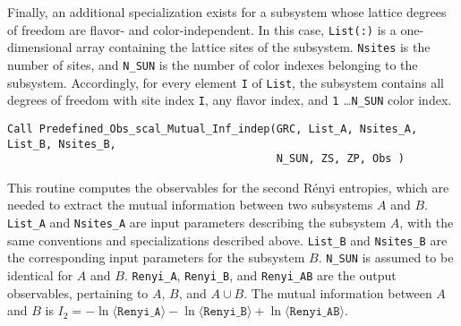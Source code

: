 Finally, an additional specialization exists for a subsystem whose lattice degrees of freedom are flavor- and color-independent. In this case, \texttt{List(:)} is a one-dimensional array containing the lattice sites of the subsystem. \texttt{Nsites} is the number of sites, and \texttt{N\_SUN} is the number of color indexes belonging to the subsystem.
Accordingly, for every element \texttt{I} of \texttt{List}, the subsystem contains all degrees of freedom with site index \texttt{I}, any flavor index, and \texttt{1} \ldots \texttt{N\_SUN} color index.

\begin{lstlisting}[style=fortran,breaklines=true]
Call Predefined_Obs_scal_Mutual_Inf_indep(GRC, List_A, Nsites_A, List_B, Nsites_B,
                                          N_SUN, ZS, ZP, Obs )
\end{lstlisting}
This routine computes the observables for the second R\'enyi entropies, which are needed to extract the mutual information between two subsystems $A$ and $B$.
\texttt{List\_A} and \texttt{Nsites\_A} are input parameters describing the subsystem $A$, with the same conventions and specializations described above.
\texttt{List\_B} and \texttt{Nsites\_B} are the corresponding input parameters for the subsystem $B$. \texttt{N\_SUN} is assumed to be identical for $A$ and $B$.
\texttt{Renyi\_A}, \texttt{Renyi\_B}, and \texttt{Renyi\_AB} are the output observables, pertaining to $A$, $B$, and $A\cup B$. The mutual information between $A$ and $B$ is $I_2=-\ln \langle \texttt{Renyi\_A}\rangle -\ln \langle \texttt{Renyi\_B}\rangle +\ln \langle \texttt{Renyi\_AB}\rangle$.
